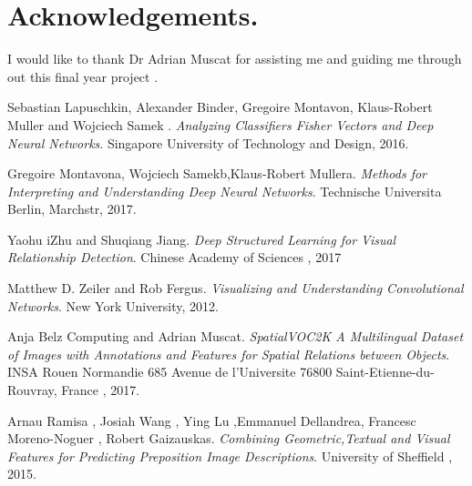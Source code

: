 \documentclass{csfyp}
\begin{document}
\section*{Acknowledgements.}
I would like to thank Dr Adrian Muscat for assisting me and guiding me through out this final year project .





\begin{thebibliography}{9}
Sebastian Lapuschkin, Alexander Binder, Gregoire Montavon, Klaus-Robert Muller and Wojciech Samek . 
\textit{Analyzing Classifiers Fisher Vectors and Deep Neural Networks}. 
Singapore University of Technology and Design, 2016.
 
Gregoire Montavona, Wojciech Samekb,Klaus-Robert Mullera. 
\textit{Methods for Interpreting and Understanding Deep Neural Networks}. 
 Technische Universita Berlin, Marchstr, 2017.

Yaohu iZhu and Shuqiang Jiang. 
\textit{Deep Structured Learning for Visual Relationship Detection}. 
 Chinese Academy of Sciences , 2017

Matthew D. Zeiler and Rob Fergus. 
\textit{Visualizing and Understanding Convolutional Networks}. 
 New York University, 2012.

 Anja Belz Computing and Adrian Muscat.
\textit{SpatialVOC2K A Multilingual Dataset of Images with Annotations and Features for Spatial Relations between Objects}. 
INSA Rouen Normandie 685 Avenue de l’Universite 76800 Saint-Etienne-du-Rouvray, France , 2017.

Arnau Ramisa , Josiah Wang , Ying Lu ,Emmanuel Dellandrea, Francesc Moreno-Noguer , Robert Gaizauskas.
\textit{Combining Geometric,Textual and Visual Features for Predicting Preposition Image Descriptions}. 
 University of Sheffield , 2015.


\end{thebibliography}
\end{document}

